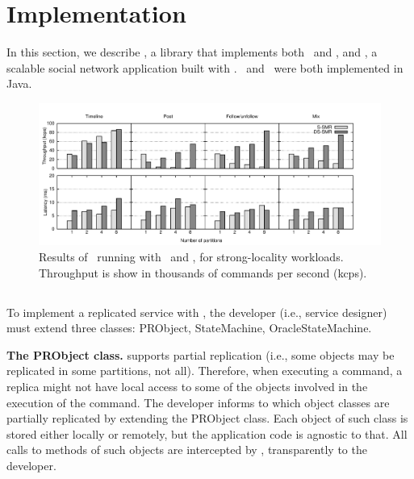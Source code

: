 \section{Implementation}
\label{sec:implementation}

In this section, we describe \libname{}, a library that implements both \ssmr\ and \dssmr{}, and \appname{}, a scalable social network application built with \libname{}. \libname\ and \appname\ were both implemented in Java.

\begin{figure}
\begin{minipage}[b]{1\linewidth} %
\centering
      \includegraphics[width=1.0\linewidth]{figures/graphs/strong-locality}
\end{minipage}
\caption{Results of \appname\ running with \ssmr\ and \dssmr{}, for strong-locality workloads. Throughput is show in thousands of commands per second (kcps).}
\label{fig:strongloc}
\end{figure}

\subsection{\libname}

To implement a replicated service with \libname{}, the developer (i.e., service designer) must extend three classes: PRObject, StateMachine, OracleStateMachine.

\textbf{The PRObject class.} \libname{} supports partial replication (i.e., some objects may be replicated in some partitions, not all). Therefore, when executing a command, a replica might not have local access to some of the objects involved in the execution of the command. The developer informs to \libname{} which object classes are partially replicated by extending the PRObject class. Each object of such class is stored either locally or remotely, but the application code is agnostic to that. All calls to methods of such objects are intercepted by \appname{}, transparently to the developer.

